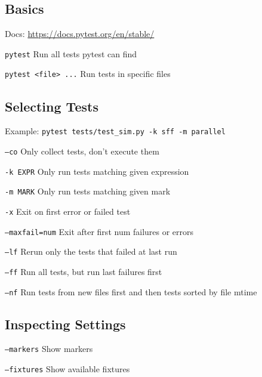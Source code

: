 \documentclass[10pt,landscape,a4paper]{article}
\begin{document}
\begin{multicols}{2}

\subsection{Basics}
Docs: \url{https://docs.pytest.org/en/stable/}

\begin{eqlist}
	\item[\texttt{pytest}] Run all tests pytest can find
	\item[\texttt{pytest <file> ...}] Run tests in specific files
\end{eqlist}

\subsection{Selecting Tests}

Example: \texttt{pytest tests/test\_sim.py -k sff -m parallel}

\begin{eqlist}
	\item[\texttt{--co}] Only collect tests, don't execute them
	\item[\texttt{-k EXPR}] Only run tests matching given expression
	\item[\texttt{-m MARK}] Only run tests matching given mark
	\item[\texttt{-x}] Exit on first error or failed test
	\item[\texttt{--maxfail=num}] Exit after first num failures or errors
	\item[\texttt{--lf}] Rerun only the tests that failed at last run
	\item[\texttt{--ff}] Run all tests, but run last failures first
	\item[\texttt{--nf}] Run tests from new files first and then tests sorted by file mtime
\end{eqlist}

\subsection{Inspecting Settings}
\begin{eqlist}
	\item[\texttt{--markers}] Show markers
	\item[\texttt{--fixtures}] Show available fixtures
\end{eqlist}


\end{multicols}
\end{document}
